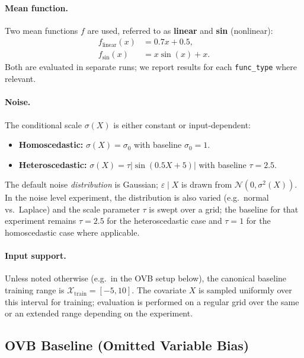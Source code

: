 \paragraph{Mean function.}
Two mean functions \(f\) are used, referred to as \textbf{linear} and \textbf{sin} (nonlinear):
\begin{align}
  f_{\text{linear}}(x) &= 0.7x + 0.5, \\
  f_{\text{sin}}(x)     &= x\sin(x) + x.
\end{align}
Both are evaluated in separate runs; we report results for each \texttt{func\_type} where relevant.

\paragraph{Noise.}
The conditional scale \(\sigma(X)\) is either constant or input-dependent:
\begin{itemize}
  \item \textbf{Homoscedastic:} \(\sigma(X) = \sigma_0\) with baseline \(\sigma_0 = 1\).
  \item \textbf{Heteroscedastic:} \(\sigma(X) = \tau \bigl\lvert \sin(0.5 X + 5) \bigr\rvert\) with baseline \(\tau = 2.5\).
\end{itemize}
The default noise \emph{distribution} is Gaussian; \(\varepsilon \mid X\) is drawn from \(\mathcal{N}(0, \sigma^2(X))\). In the noise level experiment, the distribution is also varied (e.g.\ normal vs.\ Laplace) and the scale parameter \(\tau\) is swept over a grid; the baseline for that experiment remains \(\tau = 2.5\) for the heteroscedastic case and \(\tau = 1\) for the homoscedastic case where applicable.

\paragraph{Input support.}
Unless noted otherwise (e.g.\ in the OVB setup below), the canonical baseline training range is \(\mathcal{X}_{\text{train}} = [-5, 10]\). The covariate \(X\) is sampled uniformly over this interval for training; evaluation is performed on a regular grid over the same or an extended range depending on the experiment.

\subsection{OVB Baseline (Omitted Variable Bias)}
\label{sec:ovb-baseline-dgp}


